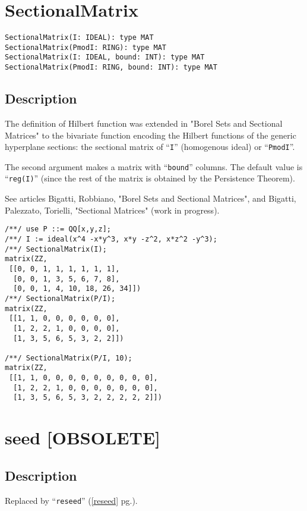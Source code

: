\documentclass[a4paper]{mybook}
\newenvironment{command}{}{} %
\begin{document}
\section{SectionalMatrix}
\label{SectionalMatrix}
\begin{command} %


\begin{Verbatim}[label=syntax, rulecolor=\color{MidnightBlue},
frame=single]
SectionalMatrix(I: IDEAL): type MAT
SectionalMatrix(PmodI: RING): type MAT
SectionalMatrix(I: IDEAL, bound: INT): type MAT
SectionalMatrix(PmodI: RING, bound: INT): type MAT
\end{Verbatim}


\subsection*{Description}

The definition of Hilbert function was extended in 
"Borel Sets and Sectional Matrices" to the bivariate function
encoding the Hilbert functions of the generic hyperplane sections:
the sectional matrix of ``\verb&I&'' (homogenous ideal)
or ``\verb&PmodI&''.
\par 
The second argument makes a matrix with ``\verb&bound&'' columns.
The default value is ``\verb&reg(I)&'' (since the rest of the matrix is
obtained by the Persistence Theorem).
\par 
See articles Bigatti, Robbiano, 
"Borel Sets and Sectional Matrices", and
Bigatti, Palezzato, Torielli,
"Sectional Matrices" (work in progress).
\begin{Verbatim}[label=example, rulecolor=\color{PineGreen}, frame=single]
/**/ use P ::= QQ[x,y,z];
/**/ I := ideal(x^4 -x*y^3, x*y -z^2, x*z^2 -y^3);
/**/ SectionalMatrix(I);
matrix(ZZ,
 [[0, 0, 1, 1, 1, 1, 1, 1],
  [0, 0, 1, 3, 5, 6, 7, 8],
  [0, 0, 1, 4, 10, 18, 26, 34]])
/**/ SectionalMatrix(P/I);
matrix(ZZ,
 [[1, 1, 0, 0, 0, 0, 0, 0],
  [1, 2, 2, 1, 0, 0, 0, 0],
  [1, 3, 5, 6, 5, 3, 2, 2]])

/**/ SectionalMatrix(P/I, 10);
matrix(ZZ,
 [[1, 1, 0, 0, 0, 0, 0, 0, 0, 0, 0],
  [1, 2, 2, 1, 0, 0, 0, 0, 0, 0, 0],
  [1, 3, 5, 6, 5, 3, 2, 2, 2, 2, 2]])
\end{Verbatim}


\end{command} %

\section{seed [OBSOLETE]}
\label{seed [OBSOLETE]}
\begin{command} %



\subsection*{Description}

Replaced by ``\verb&reseed&'' (\ref{reseed} pg.\pageref{reseed}).

\end{command} %
\end{document}
